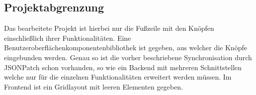 \subsection{Projektabgrenzung}
\label{projektabgrenzung}
Das bearbeitete Projekt ist hierbei nur die Fußzeile mit den Knöpfen einschließlich ihrer Funktionalitäten. Eine Benutzeroberflächenkomponentenbibliothek ist gegeben, aus welcher die Knöpfe eingebunden werden. Genau so ist die vorher beschriebene Synchronisation durch JSONPatch schon vorhanden, so wie ein Backend mit mehreren Schnittstellen welche nur für die einzelnen Funktionalitäten erweitert werden müssen. Im Frontend ist ein Gridlayout mit leeren Elementen gegeben.